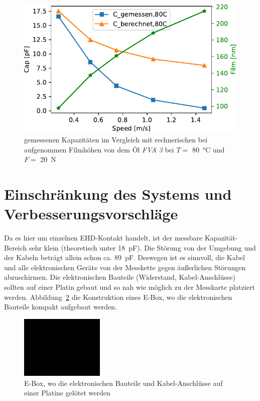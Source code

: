 \begin{figure}[htb]
    \centering
    \includegraphics[]{./images/cap_theo_meas_vs_speed_80C.pdf}
    \caption{gemessenen Kapazitäten im Vergleich mit rechnerischen bei aufgenommen Filmhöhen von dem Öl \textit{FVA 3} bei $T =$ \SI{80}{\degreeCelsius} und $F =$ \SI{20}{\N}}
    \label{fig:cap_meas_cap_theo_80C}
\end{figure}

\section{Einschränkung des Systems und Verbesserungsvorschläge}
\label{sec:einschraenkung_des_systems_und_verbesserungsvorschlaege}

Da es hier um einzelnen EHD-Kontakt handelt, ist der messbare Kapazität-Bereich sehr klein (theoretisch unter \SI{18}{\pico\farad}).
Die Störung von der Umgebung und der Kabeln beträgt allein schon ca. \SI{89}{\pico\farad}.
Deswegen ist es sinnvoll, die Kabel und alle elektronischen Geräte von der Messkette gegen äußerlichen Störungen abzuschirmen.
Die elektronischen Bauteile (Widerstand, Kabel-Anschlüsse) sollten auf einer Platin gebaut und so nah wie möglich zu der Messkarte platziert werden.
Abbildung~\ref{fig:ebox_fuer_mobil_und_lcr_meter} die Konstruktion eines E-Box, wo die elektronischen Bauteile kompakt aufgebaut werden.

\begin{figure}[htb]
    \centering
    \includegraphics[width=4cm]{./images/blank_img.jpg}
    \caption{E-Box, wo die elektronischen Bauteile und Kabel-Anschlüsse auf einer Platine gelötet werden}
    \label{fig:ebox_fuer_mobil_und_lcr_meter}
\end{figure}

